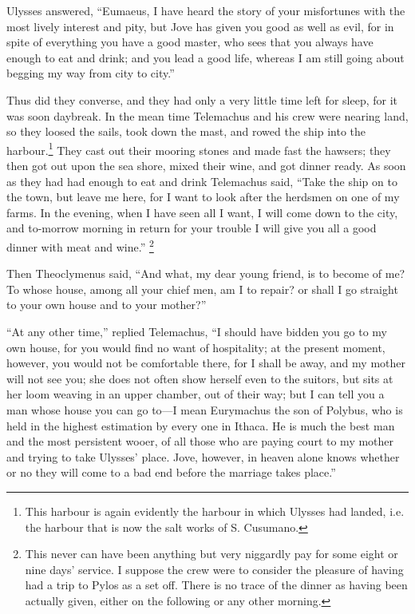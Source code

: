 Ulysses answered, “Eumaeus, I have heard the story of your misfortunes with the
most lively interest and pity, but Jove has given you good as well as evil, for
in spite of everything you have a good master, who sees that you always have
enough to eat and drink; and you lead a good life, whereas I am still going
about begging my way from city to city.”

Thus did they converse, and they had only a very little time left for sleep,
for it was soon daybreak. In the mean time Telemachus and his crew were nearing
land, so they loosed the sails, took down the mast, and rowed the ship into the
harbour.\footnote{This harbour is again evidently the harbour in which Ulysses had landed,
i.e. the harbour that is now the salt works of S. Cusumano.}
They cast out their mooring stones and made fast the hawsers; they then got out
upon the sea shore, mixed their wine, and got dinner ready. As soon as they had
had enough to eat and drink Telemachus said, “Take the ship on to the town, but
leave me here, for I want to look after the herdsmen on one of my farms. In the
evening, when I have seen all I want, I will come down to the city, and
to-morrow morning in return for your trouble I will give you all a good dinner
with meat and wine.” \footnote{This never can have been anything but very niggardly pay for some eight or
nine days’ service. I suppose the crew were to consider the pleasure of having
had a trip to Pylos as a set off. There is no trace of the dinner as having
been actually given, either on the following or any other morning.}

Then Theoclymenus said, “And what, my dear young friend, is to become of me? To
whose house, among all your chief men, am I to repair? or shall I go straight
to your own house and to your mother?”

“At any other time,” replied Telemachus, “I should have bidden you go to my own
house, for you would find no want of hospitality; at the present moment,
however, you would not be comfortable there, for I shall be away, and my mother
will not see you; she does not often show herself even to the suitors, but sits
at her loom weaving in an upper chamber, out of their way; but I can tell you a
man whose house you can go to—I mean Eurymachus the son of Polybus, who is held
in the highest estimation by every one in Ithaca. He is much the best man and
the most persistent wooer, of all those who are paying court to my mother and
trying to take Ulysses’ place. Jove, however, in heaven alone knows whether or
no they will come to a bad end before the marriage takes place.”

